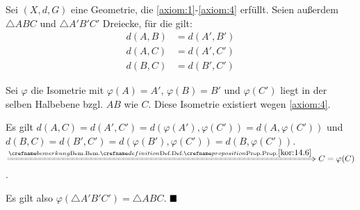 \begin{solution}[\ref{ub-tut-24:a3}]%
    Sei $(X,d,G)$ eine Geometrie, die \ref{axiom:1}-\ref{axiom:4} erfüllt.
    Seien außerdem $\triangle ABC$ und $\triangle A'B' C'$ Dreiecke, für die gilt:
    \begin{align*}
        d(A, B)  &= d(A', B')\\
        d(A, C)  &= d(A', C')\\
        d(B, C)  &= d(B', C')
    \end{align*}

    Sei $\varphi$ die Isometrie mit $\varphi(A) = A'$, $\varphi(B) = B'$ und
    $\varphi(C')$ liegt in der selben Halbebene bzgl. $AB$ wie $C$. Diese
    Isometrie existiert wegen \ref{axiom:4}.

    Es gilt $d(A,C) = d(A', C') = d(\varphi(A'), \varphi(C')) = d(A, \varphi(C'))$
    und $d(B,C) = d(B', C') = d(\varphi(B'), \varphi(C')) = d(B, \varphi(C'))$.\\
    $\xRightarrow{\crefabbr{kor:14.6}} C = \varphi(C)$.

    Es gilt also $\varphi(\triangle A'B'C') = \triangle ABC$. $\qed$
\end{solution}